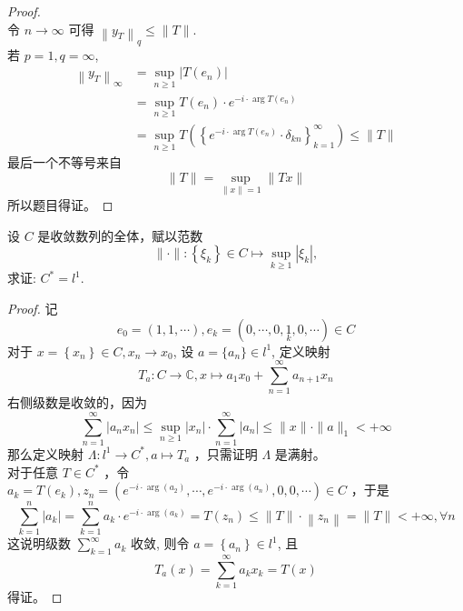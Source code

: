 \documentclass[lang=cn,newtx,10pt,scheme=chinese,thmcnt=chapter]{elegantbook}
\begin{document}
\begin{proof}
\begin{equation*}
\end{equation*}
令 $n \rightarrow \infty$ 可得 $\left\|y_T\right\|_q \leqslant\|T\|$.\\
若 $p=1, q=\infty$,
\begin{equation*}
\begin{aligned}
\left\|y_T\right\|_{\infty} & =\sup _{n \geqslant 1}\left|T\left(e_n\right)\right| \\
& =\sup _{n \geqslant 1} T\left(e_n\right) \cdot e^{-i \cdot \arg T\left(e_n\right)} \\
& =\sup _{n \geqslant 1} T\left(\left\{e^{-i \cdot \arg T\left(e_n\right)} \cdot \delta_{k n}\right\}_{k=1}^{\infty}\right) \leqslant\|T\|
\end{aligned}
\end{equation*}
最后一个不等号来自
\begin{equation*}
\|T\|=\sup _{\|x\|=1}\|T x\|
\end{equation*}
所以题目得证。
\end{proof}
\begin{problem}
  设 ${C}$ 是收敛数列的全体，赋以范数
\[
  \|\cdot\| : \left\{\xi_k\right\} \in C \mapsto \sup_{k \geqslant 1} |\xi_k|,
  \]
  求证: ${C}^* = {l}^1$.
\end{problem}
\begin{proof}
    记
    \begin{equation*}
    e_0=(1,1, \cdots), e_k=(0, \cdots, 0, \underset{k}{1}, 0, \cdots) \in C
    \end{equation*}
    对于 $x=\left\{x_n\right\} \in C, x_n \rightarrow x_0$, 设 $a=\{a_n \}\in l^1$, 定义映射
    \begin{equation*}
    T_a: C \rightarrow \mathbb{C} , x \mapsto a_1 x_0+\sum_{n=1}^{\infty} a_{n+1} x_n
    \end{equation*}
    右侧级数是收敛的，因为
    \begin{equation*}
    \sum_{n=1}^{\infty}\left|a_{n} x_n\right| \leqslant \sup _{n \geqslant 1}\left|x_n\right| \cdot \sum_{n=1}^{\infty}\left|a_{n}\right| \leqslant\|x\| \cdot\|a\|_1<+\infty
    \end{equation*}
    那么定义映射 $\Lambda: l^1 \rightarrow C^*, a \mapsto T_a$ ，只需证明 $\Lambda$ 是满射。\\
    对于任意 $T \in C^*$ ，令 $a_{k}=T\left(e_k\right), z_n=\left( e ^{- i \cdot \arg \left(a_2\right)}, \cdots, e ^{- i \cdot \arg \left(a_n\right)}, 0,0, \cdots\right) \in C$ ，于是
    \begin{equation*}
    \sum_{k=1}^n\left|a_k\right|=\sum_{k=1}^n a_k \cdot e^{-i \cdot \arg \left(a_k\right)}=T\left(z_n\right) \leqslant\|T\| \cdot\left\|z_n\right\|=\|T\|<+\infty, \forall n
    \end{equation*}
    这说明级数 $\sum_{k=1}^{\infty} a_k$ 收敛, 
    则令 $a=\left\{a_n\right\} \in l^1$, 且
    \begin{equation*}
    T_a(x)=\sum_{k=1}^{\infty} a_k x_{k}=T(x)
    \end{equation*}
    得证。
    \end{proof}
\end{document}
